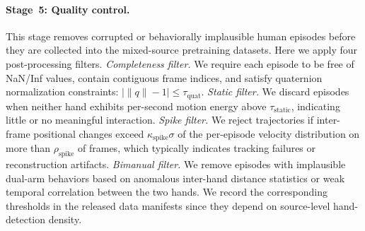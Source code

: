 \documentclass{llmxive}
\begin{document}
\paragraph{Stage~5: Quality control.}
This stage removes corrupted or behaviorally implausible human episodes before they are collected into the mixed-source pretraining datasets. Here we apply four post-processing filters. 
\emph{Completeness filter.} We require each
episode to be free of NaN/Inf values, contain contiguous frame indices, and satisfy quaternion normalization constraints: $|\|q\|-1| \le \tau_{\mathrm{quat}}$. \emph{Static filter.} We discard episodes when neither hand exhibits per-second motion energy above $\tau_{\mathrm{static}}$, indicating little or no meaningful interaction. 
\emph{Spike filter.} We reject trajectories if inter-frame positional changes exceed $\kappa_{\mathrm{spike}}\sigma$ of the per-episode velocity distribution on more than $\rho_{\mathrm{spike}}$ of frames, which typically indicates tracking failures or reconstruction artifacts.
\emph{Bimanual filter.} We remove episodes with implausible dual-arm behaviors based on anomalous inter-hand distance statistics or weak temporal correlation between the two hands. We record the corresponding thresholds in the released data manifests since they depend on source-level hand-detection density.
\end{document}
